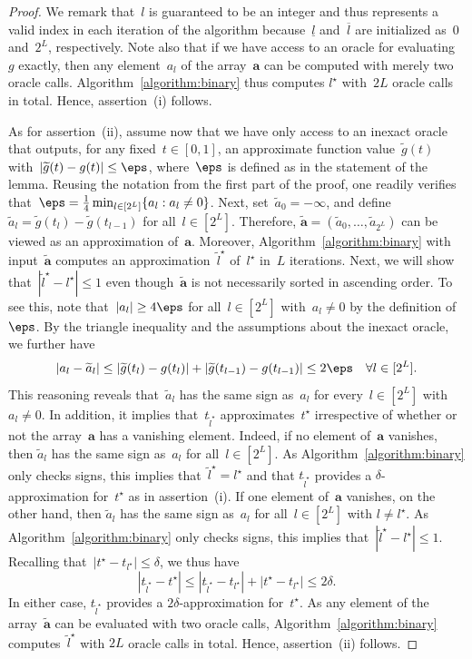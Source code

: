 \documentclass[11pt, a4paper, oneside, reqno]{article}
\begin{document}
{\begin{proof}
We remark that~$l$ is guaranteed to be an integer and thus represents a valid index in each iteration of the algorithm because~$\underline l$ and~$\overline l$ are initialized as~$0$ and~$2^L$, respectively. Note also that if we have access to an oracle for evaluating~$g$ exactly, then any element~$a_l$ of the array~$\bm a$ can be computed with merely two oracle calls.  Algorithm~\ref{algorithm:binary} thus computes $l^\star$ with~$2L$ oracle calls in total. Hence, assertion~(i) follows.
    
As for assertion~(ii), assume now that we have only access to an inexact oracle that outputs, for any fixed~$t\in[0,1]$, an approximate function value~$\widetilde g(t)$ with~$|\widetilde g(t)- g(t)| \leq \eps$, where~$\eps$ is defined as in the statement of the lemma. Reusing the notation from the first part of the proof, one readily verifies that~$\eps = \frac{1}{4}\min_{l \in [2^{L}]}\{a_l : a_l \neq 0\}$. Next, set~$\widetilde a_0 = -\infty$, and define~$\widetilde a_l = \widetilde g(t_{l}) -\widetilde g(t_{l-1})$ for all~$l \in [2^{L}]$. Therefore, $\widetilde{\bm a} = (\widetilde a_0, \ldots, \widetilde a_{2^{L}})$ can be viewed as an approximation of~$\bm a$. Moreover, Algorithm~\ref{algorithm:binary} with input~$\widetilde{\bm a}$ computes an approximation~$\tilde l^\star$ of~$l^\star$ in~$L$ iterations. Next, we will show that~$|\tilde l^\star - l^\star| \leq 1$ even though~$\widetilde{\bm a}$ is not necessarily sorted in ascending order. To see this, note that~$|a_l| \geq 4 \eps$ for all~$l\in[2^L]$ with~$a_l\neq 0$ by the definition of~$\eps$. By the triangle inequality and the assumptions about the inexact oracle, we further have
\[
    |a_l- \widetilde a_l| \leq |\widetilde g(t_{l}) - g(t_{l})| + |\widetilde g(t_{l-1}) - g(t_{l-1})| \leq 2\eps\quad \forall l\in[2^L].
\]
This reasoning reveals that~$\widetilde a_l$ has the same sign as~$a_l$ for every~$l\in[2^L]$ with~$a_l\neq 0$. In addition, it implies that~$t_{\tilde l^\star}$ approximates~$t^\star$ irrespective of whether or not the array~$\bm a$ has a vanishing element. Indeed, if no element of~$\bm a$ vanishes, then $\widetilde a_l$ has the same sign as~$a_l$ for all~$l \in [2^{L}]$. As Algorithm~\ref{algorithm:binary} only checks signs, this implies that~$\tilde l^\star=l^\star$ and that $t_{\tilde l^\star}$ provides a $\delta$-approximation for~$t^\star$ as in assertion~(i). If one element of~$\bm a$ vanishes, on the other hand, then $\widetilde a_l$ has the same sign as~$a_l$ for all~$l \in [2^{L}]$ with $l\neq l^\star$. As Algorithm~\ref{algorithm:binary} only checks signs, this implies that~$|\tilde l^\star - l^\star| \leq 1$. Recalling that~$|t^\star - t_{l^\star}| \leq \delta $, we thus have
    	\[
    	    |t_{\tilde l^\star} - t^\star| \leq |t_{\tilde l^\star} - t_{l^\star}| + |t^\star - t_{l^\star}| \leq 2\delta.
    	\]
In either case, $t_{\tilde l^\star}$ provides a $2\delta$-approximation for~$t^\star$. As any element of the array~$\widetilde{\bm a}$ can be evaluated with two oracle calls, Algorithm~\ref{algorithm:binary} computes~$\tilde l^\star$ with $2L$ oracle calls in total. Hence, assertion~(ii) follows.
\end{proof}

}
\end{document}
